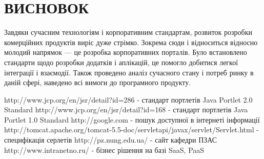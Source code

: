 \section*{ВИСНОВОК}
Завдяки сучасним технологіям і корпоративним стандартам, розвиток розробки комерційних продуктів виріс дуже стрімко. 
Зокрема сюди і відноситься відносно молодий напрямок --- це розробка корпоративних порталів. 
Було встановлено стандарти щодо розробки додатків і аплікацій, це помогло добитися легкої інтеграції і взаємодії. 
Також проведено аналіз сучасного стану і потреб ринку в даній сфері, наведено всі вимоги до програмного продукту.



\renewcommand{\refname}{ВИКОРИСТАНІ ДЖЕРЕЛА}
\begin{thebibliography}{99}
 http://www.jcp.org/en/jsr/detail?id=286 - стандарт портлетів Java Portlet 2.0 Standard 
 http://www.jcp.org/en/jsr/detail?id=168 - стандарт портлетів Java Portlet 1.0 Standard 
 http://google.com - пошук доступної в інтернеті інформації
 http://tomcat.apache.org/tomcat-5.5-doc/servletapi/javax/servlet/Servlet.html - специфікація серлетів
 http://pz.nung.edu.ua/ - сайт кафедри ПЗАС
 http://www.intranetno.ru/ - бізнес рішення на базі SaaS, PaaS
\end{thebibliography}




